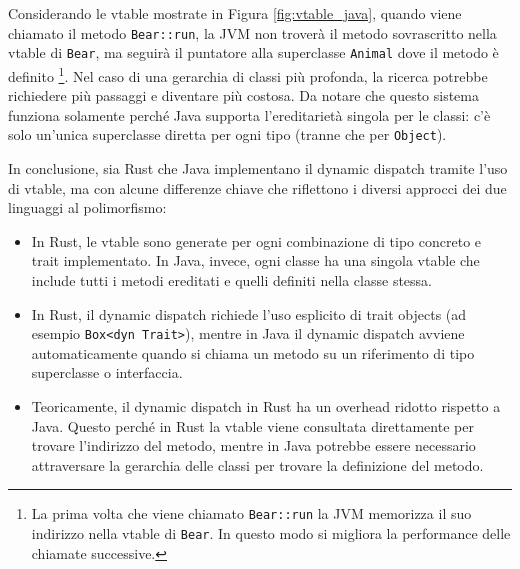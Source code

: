 Considerando le vtable mostrate in Figura \ref{fig:vtable_java}, quando viene chiamato il metodo \texttt{Bear::run}, la JVM non troverà il metodo sovrascritto nella vtable di \texttt{Bear}, ma seguirà il puntatore alla superclasse \texttt{Animal} dove il metodo è definito \footnote{La prima volta che viene chiamato \texttt{Bear::run} la JVM memorizza il suo indirizzo nella vtable di \texttt{Bear}. In questo modo si migliora la performance delle chiamate successive.}. Nel caso di una gerarchia di classi più profonda, la ricerca potrebbe richiedere più passaggi e diventare più costosa. Da notare che questo sistema funziona solamente perché Java supporta l'ereditarietà singola per le classi: c'è solo un'unica superclasse diretta per ogni tipo (tranne che per \texttt{Object}). 

In conclusione, sia Rust che Java implementano il dynamic dispatch tramite l'uso di vtable, ma con alcune differenze chiave che riflettono i diversi approcci dei due linguaggi al polimorfismo:
\begin{itemize}
    \item In Rust, le vtable sono generate per ogni combinazione di tipo concreto e trait implementato. In Java, invece, ogni classe ha una singola vtable che include tutti i metodi ereditati e quelli definiti nella classe stessa.
    \item In Rust, il dynamic dispatch richiede l'uso esplicito di trait objects (ad esempio \texttt{Box<dyn Trait>}), mentre in Java il dynamic dispatch avviene automaticamente quando si chiama un metodo su un riferimento di tipo superclasse o interfaccia.
    \item Teoricamente, il dynamic dispatch in Rust ha un overhead ridotto rispetto a Java. Questo perché in Rust la vtable viene consultata direttamente per trovare l'indirizzo del metodo, mentre in Java potrebbe essere necessario attraversare la gerarchia delle classi per trovare la definizione del metodo.     
\end{itemize}